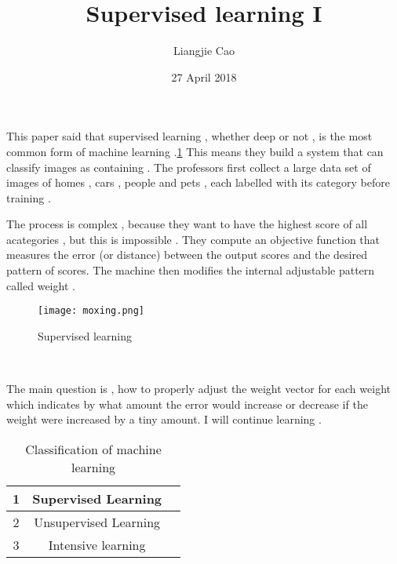 \documentclass[50pt]{article}
\begin{document}
\title{Supervised learning I}
\author{Liangjie Cao}
\date{27 April 2018}
\maketitle
\par
This paper said that supervised learning , whether deep or not , is the most common form of machine learning .\ref{Table} This means they build a system that can classify images as containing . The professors first collect a large data set of images of homes , cars , people and pets , each labelled with its category before training . \\
\par
The process is complex , because they want to have the highest score of all acategories , but this is impossible . They compute an objective function that measures the error (or distance) between the output scores and the desired pattern of scores.\cite{name1} The machine then modifies the internal adjustable pattern called weight .
 \begin{figure}[ht]
 \centering
 \texttt{[image: moxing.png]}\\
 \caption{Supervised learning}
\end{figure}\\
\par
The main question is , how to properly adjust the weight vector for each weight which indicates by what amount the error would increase or decrease if the weight were increased by a tiny amount. I will continue learning . \\
 \begin{table}[!htbp]
  \centering
 \begin{tabular}{|c|c|c|}
    \hline
    1 & Supervised Learning\\
  \hline
    2 & Unsupervised Learning\\
  \hline
   3 &  Intensive learning\\
   \hline
  \end{tabular}
  \caption{Classification of machine learning}\label{Table}
  \end{table}


\end{document}
